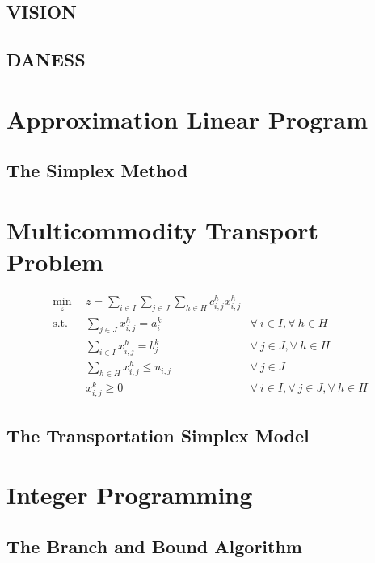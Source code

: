 \subsection{VISION}\label{sec:vision}
\subsection{DANESS}\label{sec:daness}

\section{Approximation Linear Program}\label{sec:approx}

\subsection{The Simplex Method}

\section{Multicommodity Transport Problem}\label{sec:MCTP}

\begin{subequations}\label{eqs:MCTP}
  \begin{align}
    \min_{z} \:\: & 
    z = \sum_{i \in I}\sum_{j \in J}\sum_{h \in H} c_{i,j}^{h} x_{i,j}^{h}
    & \label{eqs:MCTP_obj} \\
    \text{s.t.} \:\: &
    \sum_{j \in J} x_{i,j}^{h} = a_{i}^{k}
    &
    \forall \: i \in I, \forall \: h \in H \label{eqs:MCTP_sup} \\
    &
    \sum_{i \in I} x_{i,j}^{h} = b_{j}^{k}
    & 
    \forall \: j \in J, \forall \: h \in H \label{eqs:MCTP_dem} \\
    &
    \sum_{h \in H} x_{i,j}^{h} \leq u_{i,j}
    & 
    \forall \: j \in J \label{eqs:MCTP_cap} \\
    &
    x_{i,j}^{k} \geq 0
    &
    \forall \: i \in I, \forall \: j \in J, \forall \: h \in H \label{eqs:MCTP_x}
  \end{align}
\end{subequations}


\subsection{The Transportation Simplex Model}\label{sec:trans-simplex}

\section{Integer Programming}

\subsection{The Branch and Bound Algorithm}\label{sec:bnb}
